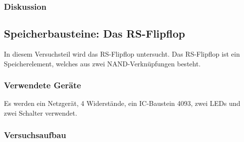 \documentclass[12pt,a4paper]{article}
\begin{document}
\subsubsection*{Diskussion}



\subsection{Speicherbausteine: Das RS-Flipflop}

In diesem Versuchsteil wird das RS-Flipflop untersucht. Das RS-Flipflop ist ein Speicherelement, welches aus zwei NAND-Verknüpfungen besteht.

\subsubsection*{Verwendete Geräte}
Es werden ein Netzgerät, 4 Widerstände, ein IC-Baustein 4093, zwei LEDs und zwei Schalter verwendet.
\subsubsection*{Versuchsaufbau}
\end{document}
